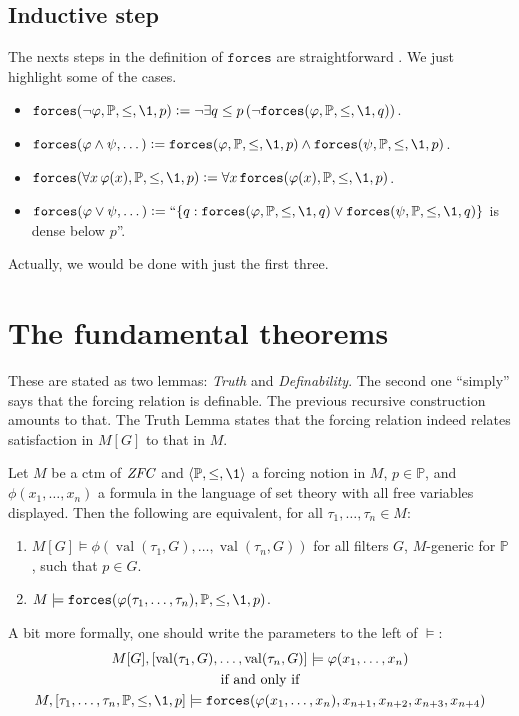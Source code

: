 \documentclass[11pt,english]{article}
\renewcommand{\PP}{\mathbb{P}}
\newcommand{\forceisa}{\mathtt{forces}}
\DeclareMathOperator{\val}{val}
\begin{document}
\subsection{Inductive step}
%
The nexts steps in the definition of $\forceisa$ are straightforward
\cite[IV.2.42]{kunen2011set}. We just highlight some of the cases.
\begin{itemize}
\item $\forceisa(\neg\phi,\PP,\leq,\1,p) \defi \neg\exists
  q\leq p \,(\neg \forceisa(\phi,\PP,\leq,\1,q))$.
\item
  $\forceisa(\phi\y\psi,\dots)\defi\forceisa(\phi,\PP,\leq,\1,p)\y\forceisa(\psi,\PP,\leq,\1,p)$.
\item $\forceisa(\forall x\,\phi(x),\PP,\leq,\1,p)\defi \forall x\,\forceisa(\phi(x),\PP,\leq,\1,p)$. 
\item
  $\forceisa(\phi\o\psi,\dots)\defi\text{``}\{q:\forceisa(\phi,\PP,\leq,\1,q)\o\forceisa(\psi,\PP,\leq,\1,q)\}$
  is dense below $p$''. 
\end{itemize}
%
Actually, we would be done with just the first three.

\section{The fundamental theorems}
These are stated as two lemmas: \emph{Truth} and
\emph{Definability}. The second one ``simply'' says that the forcing
relation is definable. The previous recursive construction amounts to
that. The Truth Lemma states that the forcing relation indeed relates
satisfaction in $M[G]$ to that in $M$. 
\begin{lemma}
  Let $M$ be a ctm of $\mathit{ZFC}$ and $\lb\PP,\leq,\1\rb$ a forcing notion
  in $M$, $p\in\PP$, and $\phi(x_1,\dots,x_n)$ a formula in the
  language of set 
  theory with all free variables displayed. Then the
  following are equivalent, for all $\tau_1,\dots,\tau_n\in M$: 
  \begin{enumerate}
  \item     $M[G]\models\phi(\val(\tau_1,G),\dots,\val(\tau_n,G))$ for
    all filters $G$, $M$-generic for $\PP$, such that $p\in G$.
  \item $M\models\forceisa(\phi(\tau_1,\dots,\tau_n),\PP,\leq,\1,p)$.
  \end{enumerate}
\end{lemma}
A bit more formally, one should write the parameters to the left of
$\models$:
\begin{gather*}
  M[G],[\val(\tau_1,G),\dots,\val(\tau_n,G)]
  \models\phi(x_1,\dots,x_n) \\
  \text{if and only if}\\
  M,[\tau_1,\dots,\tau_n,\PP,\leq,\1,p] 
  \models\forceisa(\phi(x_1,\dots,x_n),x_{n+1},x_{n+2},x_{n+3},x_{n+4})
\end{gather*}
\end{document}
